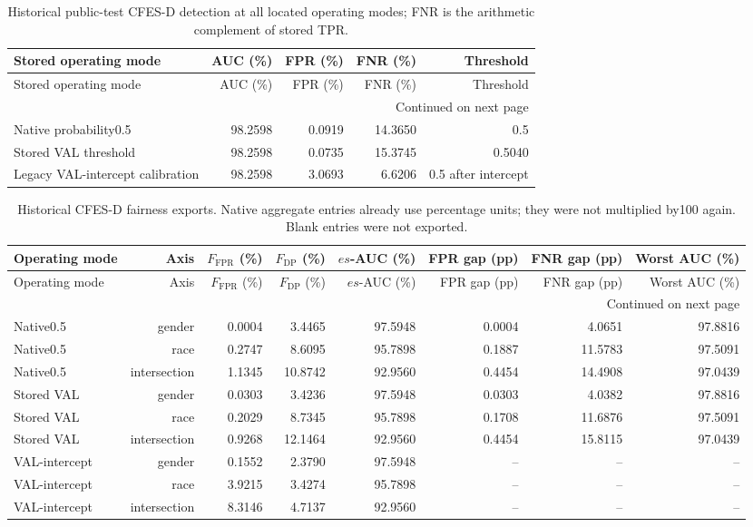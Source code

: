 \documentclass[10pt]{article}
\begin{document}
\begin{longtable}{@{}lrrrr@{}}
\caption{Historical public-test CFES-D detection at all located operating modes; FNR is the arithmetic complement of stored TPR.}\\
\toprule
Stored operating mode & AUC (\%) & FPR (\%) & FNR (\%) & Threshold \\
\midrule
\endfirsthead
\toprule
Stored operating mode & AUC (\%) & FPR (\%) & FNR (\%) & Threshold \\
\midrule
\endhead
\midrule
\multicolumn{5}{r}{Continued on next page}\\
\endfoot
\bottomrule
\endlastfoot
Native probability0.5 & 98.2598 & 0.0919 & 14.3650 & 0.5 \\
Stored VAL threshold & 98.2598 & 0.0735 & 15.3745 & 0.5040 \\
Legacy VAL-intercept calibration & 98.2598 & 3.0693 & 6.6206 & 0.5 after intercept \\
\end{longtable}

\begin{longtable}{@{}lrrrrrrr@{}}
\caption{Historical CFES-D fairness exports. Native aggregate entries already use percentage units; they were not multiplied by100 again. Blank entries were not exported.}\\
\toprule
Operating mode & Axis & $F_{\mathrm{FPR}}$ (\%) & $F_{\mathrm{DP}}$ (\%) & $es$-AUC (\%) & FPR gap (pp) & FNR gap (pp) & Worst AUC (\%) \\
\midrule
\endfirsthead
\toprule
Operating mode & Axis & $F_{\mathrm{FPR}}$ (\%) & $F_{\mathrm{DP}}$ (\%) & $es$-AUC (\%) & FPR gap (pp) & FNR gap (pp) & Worst AUC (\%) \\
\midrule
\endhead
\midrule
\multicolumn{8}{r}{Continued on next page}\\
\endfoot
\bottomrule
\endlastfoot
Native0.5 & gender & 0.0004 & 3.4465 & 97.5948 & 0.0004 & 4.0651 & 97.8816 \\
Native0.5 & race & 0.2747 & 8.6095 & 95.7898 & 0.1887 & 11.5783 & 97.5091 \\
Native0.5 & intersection & 1.1345 & 10.8742 & 92.9560 & 0.4454 & 14.4908 & 97.0439 \\
Stored VAL & gender & 0.0303 & 3.4236 & 97.5948 & 0.0303 & 4.0382 & 97.8816 \\
Stored VAL & race & 0.2029 & 8.7345 & 95.7898 & 0.1708 & 11.6876 & 97.5091 \\
Stored VAL & intersection & 0.9268 & 12.1464 & 92.9560 & 0.4454 & 15.8115 & 97.0439 \\
VAL-intercept & gender & 0.1552 & 2.3790 & 97.5948 & -- & -- & -- \\
VAL-intercept & race & 3.9215 & 3.4274 & 95.7898 & -- & -- & -- \\
VAL-intercept & intersection & 8.3146 & 4.7137 & 92.9560 & -- & -- & -- \\
\end{longtable}
\end{document}

